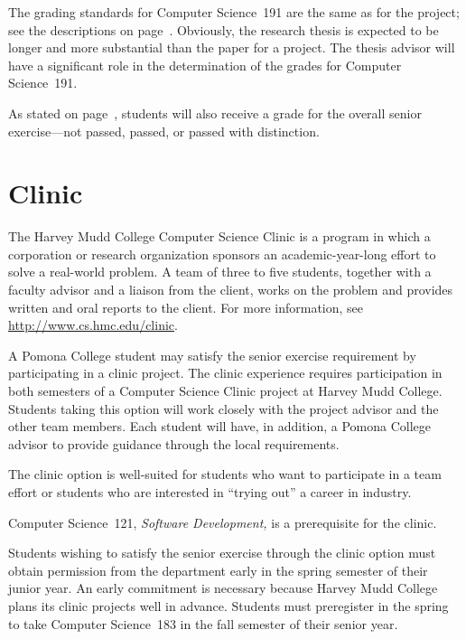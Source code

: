 \documentclass[finalcopy]{srpaper}
\def\hyperref[#1]{}
\let\plainpageref\pageref
\newcommand{\plainpageref}{\pageref*}
\newcommand{\namedpageref}[2]{\hyperref[#2]{#1~\plainpageref{#2}}}
\begin{document}
The grading standards for Computer Science~191 are the same
as for the project; see the descriptions on
\namedpageref{page}{Page:ProjectGrading}. Obviously, the
research thesis is expected to be longer and more
substantial than the paper for a project. The thesis
advisor
will have a significant role in the determination of the
grades for Computer Science~191.

As stated on
\namedpageref{page}{Page:SeniorExerciseGrading}, students
will also receive a grade for the overall senior
exercise---not passed, passed, or passed with distinction.%


\section{Clinic}
The Harvey Mudd College Computer Science Clinic is a
program in which a corporation or research organization
sponsors an academic-year-long effort to solve a real-world
problem. A team of three to five students, together with a
faculty advisor and a liaison from the client, works on the
problem and provides written and oral reports to the
client. For more information, see
\url{http://www.cs.hmc.edu/clinic}.

A Pomona College student may satisfy the senior exercise
requirement by participating in a clinic project. The clinic
experience requires participation in both semesters of a
Computer Science Clinic project at Harvey Mudd
College. Students taking this option will work closely with
the project advisor and the other team members. Each student
will have, in addition, a Pomona College 
advisor to provide
guidance through the local requirements.

The clinic option is well-suited for students who want to
participate in a team effort or students who are interested
in ``trying out'' a career in industry.

Computer Science~121, \textit{Software Development,} is a
prerequisite for the clinic.

Students wishing to satisfy the senior exercise through the
clinic option must obtain permission from the department
early in the spring semester of their junior year. An early
commitment is necessary because Harvey Mudd College plans
its clinic projects well in advance. Students must
preregister in the spring to take Computer Science~183 in
the fall semester of their senior year.
\end{document}
